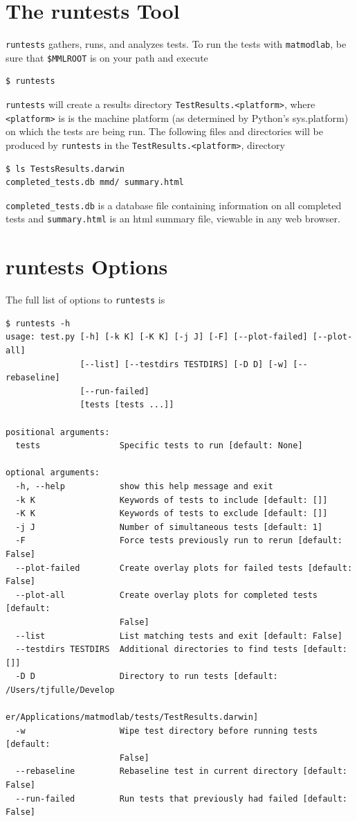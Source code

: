\documentclass[12pt,report,strict]{SANDreport/SANDreport}
\newcommand{\mml}{\texttt{matmodlab}}
\newcommand{\runtests}{\texttt{runtests}}
\begin{document}
\section{The runtests Tool}
\label{sec:rtest-run}
\runtests{} gathers, runs, and analyzes tests. To run the tests with
\mml{}, be sure that \verb|$MMLROOT| is on your path and execute

\begin{verbatim}
$ runtests
\end{verbatim}

\runtests{} will create a results directory \verb|TestResults.<platform>|,
where \texttt{<platform>} is is the machine platform (as determined by
Python's sys.platform) on which the tests are being run. The following files
and directories will be produced by \runtests{} in the
\verb|TestResults.<platform>|, directory
\begin{verbatim}
$ ls TestsResults.darwin
completed_tests.db mmd/ summary.html
\end{verbatim}
%
\texttt{completed\_tests.db} is a database file containing information on all
completed tests and \texttt{summary.html} is an html summary file, viewable in
any web browser.

\section{runtests Options}
\label{sec:rtest-options}
The full list of options to \runtests{} is
\begin{verbatim}
$ runtests -h
usage: test.py [-h] [-k K] [-K K] [-j J] [-F] [--plot-failed] [--plot-all]
               [--list] [--testdirs TESTDIRS] [-D D] [-w] [--rebaseline]
               [--run-failed]
               [tests [tests ...]]

positional arguments:
  tests                Specific tests to run [default: None]

optional arguments:
  -h, --help           show this help message and exit
  -k K                 Keywords of tests to include [default: []]
  -K K                 Keywords of tests to exclude [default: []]
  -j J                 Number of simultaneous tests [default: 1]
  -F                   Force tests previously run to rerun [default: False]
  --plot-failed        Create overlay plots for failed tests [default: False]
  --plot-all           Create overlay plots for completed tests [default:
                       False]
  --list               List matching tests and exit [default: False]
  --testdirs TESTDIRS  Additional directories to find tests [default: []]
  -D D                 Directory to run tests [default: /Users/tjfulle/Develop
                       er/Applications/matmodlab/tests/TestResults.darwin]
  -w                   Wipe test directory before running tests [default:
                       False]
  --rebaseline         Rebaseline test in current directory [default: False]
  --run-failed         Run tests that previously had failed [default: False]
\end{verbatim}
\end{document}
